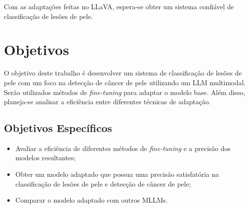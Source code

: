 Com as adaptações feitas no \ac{LLaVA}, espera-se obter um sistema confiável de classificação de lesões de pele.

\section{Objetivos}

O objetivo deste trabalho é desenvolver um sistema de classificação de lesões de pele com um foco na detecção de câncer de pele utilizando um \ac{LLM} multimodal.
Serão utilizados métodos de \textit{fine-tuning} para adaptar o modelo base. Além disso, planeja-se analisar a eficiência entre diferentes técnicas de adaptação.

\subsection*{Objetivos Específicos}

\begin{itemize}
    \item Avaliar a eficiência de diferentes métodos de \textit{fine-tuning} e a precisão dos modelos resultantes;
    \item Obter um modelo adaptado que possua uma precisão satisfatória na classificação de lesões de pele e detecção de câncer de pele;
    \item Comparar o modelo adaptado com outros \ac{MLLMs}.
\end{itemize}
